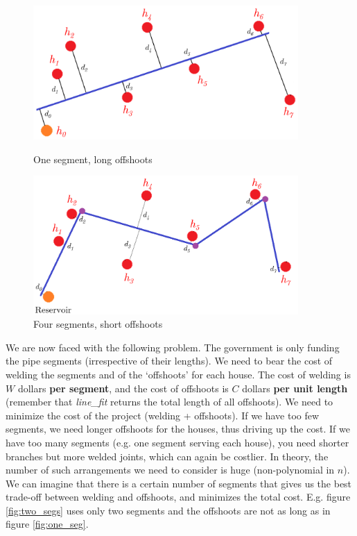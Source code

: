 \documentclass[addpoints]{exam}
\begin{document}
\begin{questions}
\begin{figure}[h!]
    \setlength{\belowcaptionskip}{-10pt}
    \centering
    \begin{minipage}{0.45\textwidth}
        \includegraphics[width=0.9\textwidth]{one_seg.png}
        \caption{One segment, long offshoots}
        \label{fig:one_seg}
    \end{minipage}
    \begin{minipage}{0.45\textwidth}
        \centering
        \includegraphics[width=0.9\textwidth]{four_segs.png}
        \caption{Four segments, short offshoots}
        \label{fig:four_segs}
    \end{minipage}
\end{figure}
\vspace{0.1\textheight}
We are now faced with the following problem. The government is only funding the pipe segments (irrespective of their lengths). We need to bear the cost of welding the segments and of the `offshoots' for each house. The cost of welding is $W$ dollars \textbf{per segment}, and the cost of offshoots is $C$ dollars \textbf{per unit length} (remember that \textit{line\_fit} returns the total length of all offshoots). We need to minimize the cost of the project (welding + offshoots). If we have too few segments, we need longer offshoots for the houses, thus driving up the cost. If we have too many segments (e.g. one segment serving each house), you need shorter branches but more welded joints, which can again be costlier. In theory, the number of such arrangements we need to consider is huge (non-polynomial in $n$). We can imagine that there is a certain number of segments that gives us the best trade-off between welding and offshoots, and minimizes the total cost. E.g. figure \ref{fig:two_segs} uses only two segments and the offshoots are not as long as in figure \ref{fig:one_seg}.


\end{questions}
\end{document}
